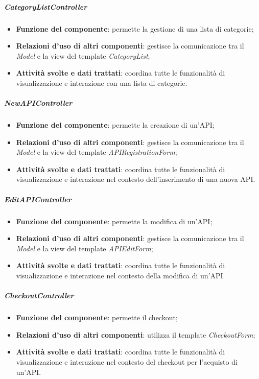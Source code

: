 \subparagraph{CategoryListController}
\begin{itemize}
	\item \textbf{Funzione del componente}: permette la gestione di una lista di categorie;
	\item \textbf{Relazioni d'uso di altri componenti}: gestisce la comunicazione tra il \textit{Model} e la view del template \textit{CategoryList};
	\item \textbf{Attività svolte e dati trattati}: coordina tutte le funzionalità di visualizzazione e interazione con una lista di categorie.
\end{itemize}

\subparagraph{NewAPIController}
\begin{itemize}
	\item \textbf{Funzione del componente}: permette la creazione di un'API;
	\item \textbf{Relazioni d'uso di altri componenti}: gestisce la comunicazione tra il \textit{Model} e la view del template \textit{APIRegistrationForm};
	\item \textbf{Attività svolte e dati trattati}: coordina tutte le funzionalità di visualizzazione e interazione nel contesto dell'inserimento di una nuova API.
\end{itemize}

\subparagraph{EditAPIController}
\begin{itemize}
	\item \textbf{Funzione del componente}: permette la modifica di un'API;
	\item \textbf{Relazioni d'uso di altri componenti}: gestisce la comunicazione tra il \textit{Model} e la view del template \textit{APIEditForm};
	\item \textbf{Attività svolte e dati trattati}: coordina tutte le funzionalità di visualizzazione e interazione nel contesto della modifica di un'API.
\end{itemize}

\subparagraph{CheckoutController}
\begin{itemize}
	\item \textbf{Funzione del componente}: permette il checkout;
	\item \textbf{Relazioni d'uso di altri componenti}: utilizza il template \textit{CheckoutForm};
	\item \textbf{Attività svolte e dati trattati}: coordina tutte le funzionalità di visualizzazione e interazione nel contesto del checkout per l'acquisto di un'API.
\end{itemize}

